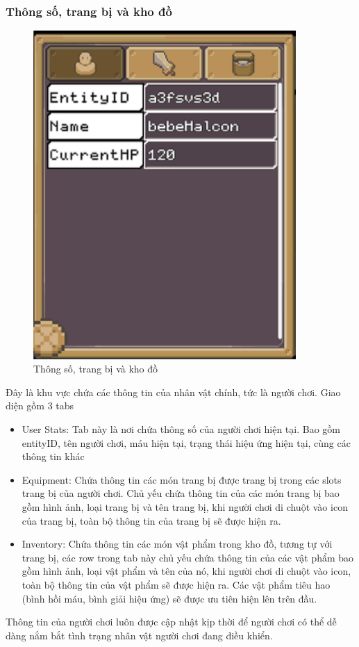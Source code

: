 \subsubsection{Thông số, trang bị và kho đồ}
\begin{figure}[H]
	\centering
	\includegraphics[width=10cm]{Images/Inventory.png}
	\vspace{0.5cm}
	\caption{Thông số, trang bị và kho đồ}
\end{figure}
\hspace*{0.5cm} Đây là khu vực chứa các thông tin của nhân vật chính, tức là người chơi. Giao diện gồm 3 tabs
\begin{itemize}
	\item User Stats: Tab này là nơi chứa thông số của người chơi hiện tại. Bao gồm entityID, tên người chơi, máu hiện tại, trạng thái hiệu ứng hiện tại, cùng các thông tin khác
	\item Equipment: Chứa thông tin các món trang bị được trang bị trong các slots trang bị của người chơi. Chủ yếu chứa thông tin của các món trang bị bao gồm hình ảnh, loại trang bị và tên trang bị, khi người chơi di chuột vào icon của trang bị, toàn bộ thông tin của trang bị sẽ được hiện ra.
	\item Inventory: Chứa thông tin các món vật phẩm trong kho đồ, tương tự với trang bị, các row trong tab này chủ yếu chứa thông tin của các vật phẩm bao gồm hình ảnh, loại vật phẩm và tên của nó, khi người chơi di chuột vào icon, toàn bộ thông tin của vật phẩm sẽ được hiện ra. Các vật phẩm tiêu hao (bình hồi máu, bình giải hiệu ứng) sẽ được ưu tiên hiện lên trên đầu.
\end{itemize}
\hspace*{0.5cm} Thông tin của người chơi luôn được cập nhật kịp thời để người chơi có thể dễ dàng nắm bắt tình trạng nhân vật người chơi đang điều khiển.
